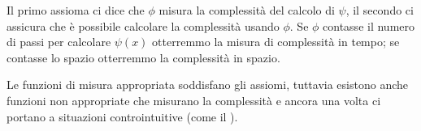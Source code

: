 Il primo assioma ci dice che $\phi$ misura la complessità del calcolo di $\psi$,
il secondo ci assicura che è possibile calcolare la complessità usando $\phi$.
Se $\phi$ contasse il numero di passi per calcolare $\psi(x)$ 
otterremmo la misura di complessità in tempo; se contasse lo spazio otterremmo
la complessità in spazio.

Le funzioni di misura appropriata soddisfano gli assiomi, tuttavia esistono
anche funzioni non appropriate che misurano la complessità e ancora una volta
ci portano a situazioni controintuitive (come il ).